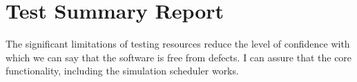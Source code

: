 \documentclass[11pt]{article}
\begin{document}
\newpage
\section{Test Summary Report}%

The significant limitations of testing resources reduce the level of confidence with which we can say that the software is free from defects. I can assure that the core functionality, including the simulation scheduler works.





\end{document}
